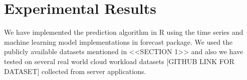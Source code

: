 \section{Experimental Results}
\usepackage{booktabs}
\usepackage{multirow}
\usepackage[normalem]{ulem}
\useunder{\uline}{\ul}{}


We have implemented the prediction algorithm in R using the time series and machine learning model implementations in forecast package. We used the publicly available datasets mentioned in <<SECTION 1>> and also we have tested on several real world cloud workload datasets [GITHUB LINK FOR DATASET] collected from server applications.

